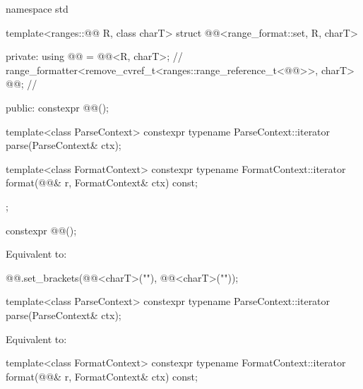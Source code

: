 %
\begin{codeblock}
namespace std {
  template<ranges::@@ R, class charT>
  struct @@<range_format::set, R, charT> {
  private:
    using @@ = @@<R, charT>;                  // \expos
    range_formatter<remove_cvref_t<ranges::range_reference_t<@@>>,
                    charT> @@;                                 // \expos

  public:
    constexpr @@();

    template<class ParseContext>
      constexpr typename ParseContext::iterator
        parse(ParseContext& ctx);

    template<class FormatContext>
      constexpr typename FormatContext::iterator
        format(@@& r, FormatContext& ctx) const;
  };
}
\end{codeblock}

%
\begin{itemdecl}
constexpr @@();
\end{itemdecl}

\begin{itemdescr}
\pnum
\effects
Equivalent to:
\begin{codeblock}
@@.set_brackets(@@<charT>("{"), @@<charT>("}"));
\end{codeblock}
\end{itemdescr}

%
\begin{itemdecl}
template<class ParseContext>
  constexpr typename ParseContext::iterator
    parse(ParseContext& ctx);
\end{itemdecl}

\begin{itemdescr}
\pnum
\effects
Equivalent to: 
\end{itemdescr}

%
\begin{itemdecl}
template<class FormatContext>
  constexpr typename FormatContext::iterator
    format(@@& r, FormatContext& ctx) const;
\end{itemdecl}

